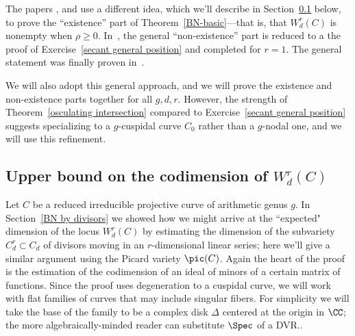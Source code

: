 
The papers \cite{MR323792}, \cite{MR0357398} and \cite{Kempf} use a different  idea, which we'll describe in Section~\ref{upper bound} below,
to prove the ``existence'' part of Theorem~\ref{BN-basic}---that is, that $W^{r}_{d}(C)$ is nonempty when
$\rho\geq 0$. In~\cite{Kleiman-special},  the general ``non-existence'' part is reduced to a the proof of Exercise~\ref{secant general position} and completed for $r=1$. The general statement was finally proven in~\cite{Griffiths-Harris-BN}.

We will also adopt this general approach, and we will prove the existence and non-existence parts together
for all $g,d,r$. However, the strength of Theorem~\ref{osculating intersection} compared to Exercise~\ref{secant general position} suggests specializing to a $g$-cuspidal curve $C_0$ rather than a $g$-nodal one, and we will use
this refinement. 

\subsection{Upper bound on the codimension of $W^r_d(C)$}\label{upper bound}

Let $C$ be a reduced irreducible projective curve of arithmetic genus $g$.  In Section~\ref{BN by divisors} we showed how we might arrive at the ``expected" dimension of the locus $W^r_d(C)$ by estimating the dimension of the subvariety $C^r_d \subset C_d$ of divisors moving in an $r$-dimensional linear series; here we'll give a similar argument using the Picard variety $\pic(C)$. Again the heart of the proof is the estimation of the
codimension of an ideal of minors of a certain matrix of functions. Since the proof uses degeneration
to a cuspidal curve, we will work with flat families of curves that may include singular fibers. For simplicity
we will take the base of the family to be a complex disk $\Delta$ centered at the origin in $\CC$; the more algebraically-minded reader can substitute $\Spec$ of a DVR..

